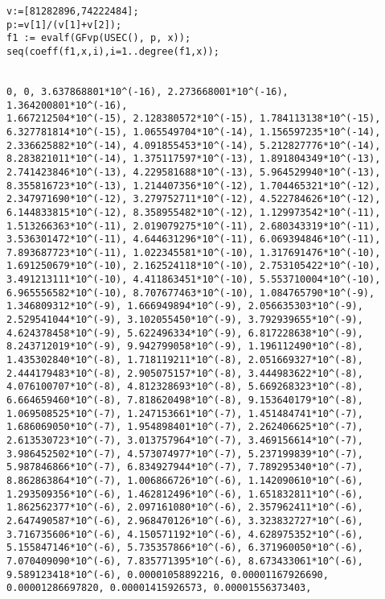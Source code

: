 \documentclass[12pt]{article}
\begin{document}
\begin{verbatim}
v:=[81282896,74222484];
p:=v[1]/(v[1]+v[2]);
f1 := evalf(GFvp(USEC(), p, x));
seq(coeff(f1,x,i),i=1..degree(f1,x));


0, 0, 3.637868801*10^(-16), 2.273668001*10^(-16), 1.364200801*10^(-16), 
1.667212504*10^(-15), 2.128380572*10^(-15), 1.784113138*10^(-15), 
6.327781814*10^(-15), 1.065549704*10^(-14), 1.156597235*10^(-14), 
2.336625882*10^(-14), 4.091855453*10^(-14), 5.212827776*10^(-14), 
8.283821011*10^(-14), 1.375117597*10^(-13), 1.891804349*10^(-13), 
2.741423846*10^(-13), 4.229581688*10^(-13), 5.964529940*10^(-13), 
8.355816723*10^(-13), 1.214407356*10^(-12), 1.704465321*10^(-12), 
2.347971690*10^(-12), 3.279752711*10^(-12), 4.522784626*10^(-12),
6.144833815*10^(-12), 8.358955482*10^(-12), 1.129973542*10^(-11), 
1.513266363*10^(-11), 2.019079275*10^(-11), 2.680343319*10^(-11), 
3.536301472*10^(-11), 4.644631296*10^(-11), 6.069394846*10^(-11), 
7.893687723*10^(-11), 1.022345581*10^(-10), 1.317691476*10^(-10), 
1.691250679*10^(-10), 2.162524118*10^(-10), 2.753105422*10^(-10), 
3.491213111*10^(-10), 4.411863451*10^(-10), 5.553710004*10^(-10), 
6.965556582*10^(-10), 8.707677463*10^(-10), 1.084765790*10^(-9), 
1.346809312*10^(-9), 1.666949894*10^(-9), 2.056635303*10^(-9), 
2.529541044*10^(-9), 3.102055450*10^(-9), 3.792939655*10^(-9), 
4.624378458*10^(-9), 5.622496334*10^(-9), 6.817228638*10^(-9), 
8.243712019*10^(-9), 9.942799058*10^(-9), 1.196112490*10^(-8), 
1.435302840*10^(-8), 1.718119211*10^(-8), 2.051669327*10^(-8), 
2.444179483*10^(-8), 2.905075157*10^(-8), 3.444983622*10^(-8), 
4.076100707*10^(-8), 4.812328693*10^(-8), 5.669268323*10^(-8), 
6.664659460*10^(-8), 7.818620498*10^(-8), 9.153640179*10^(-8), 
1.069508525*10^(-7), 1.247153661*10^(-7), 1.451484741*10^(-7), 
1.686069050*10^(-7), 1.954898401*10^(-7), 2.262406625*10^(-7), 
2.613530723*10^(-7), 3.013757964*10^(-7), 3.469156614*10^(-7), 
3.986452502*10^(-7), 4.573074977*10^(-7), 5.237199839*10^(-7), 
5.987846866*10^(-7), 6.834927944*10^(-7), 7.789295340*10^(-7), 
8.862863864*10^(-7), 1.006866726*10^(-6), 1.142090610*10^(-6), 
1.293509356*10^(-6), 1.462812496*10^(-6), 1.651832811*10^(-6), 
1.862562377*10^(-6), 2.097161080*10^(-6), 2.357962411*10^(-6), 
2.647490587*10^(-6), 2.968470126*10^(-6), 3.323832727*10^(-6), 
3.716735606*10^(-6), 4.150571192*10^(-6), 4.628975352*10^(-6), 
5.155847146*10^(-6), 5.735357866*10^(-6), 6.371960050*10^(-6), 
7.070409090*10^(-6), 7.835771395*10^(-6), 8.673433061*10^(-6), 
9.589123418*10^(-6), 0.00001058892216, 0.00001167926690, 
0.00001286697820, 0.00001415926573, 0.00001556373403, 

\end{verbatim}
\end{document}
